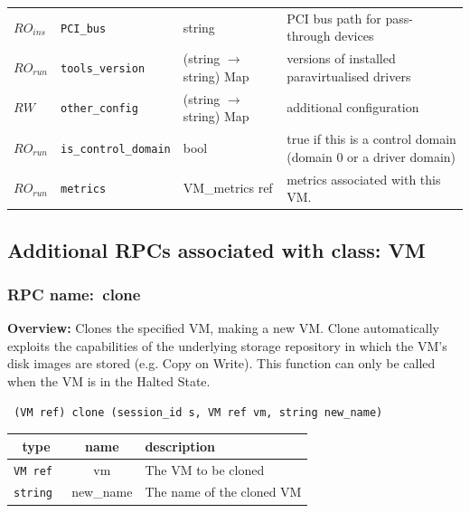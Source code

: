 \begin{longtable}{|lllp{}|}
$\mathit{RO}_\mathit{ins}$ &  {\tt PCI\_bus} & string & PCI bus path for pass-through devices \\
$\mathit{RO}_\mathit{run}$ &  {\tt tools\_version} & (string $\rightarrow$ string) Map & versions of installed paravirtualised drivers \\
$\mathit{RW}$ &  {\tt other\_config} & (string $\rightarrow$ string) Map & additional configuration \\
$\mathit{RO}_\mathit{run}$ &  {\tt is\_control\_domain} & bool & true if this is a control domain (domain 0 or a driver domain) \\
$\mathit{RO}_\mathit{run}$ &  {\tt metrics} & VM\_metrics ref & metrics associated with this VM. \\
\hline
\end{longtable}
\subsection{Additional RPCs associated with class: VM}
\subsubsection{RPC name:~clone}

{\bf Overview:} 
Clones the specified VM, making a new VM. Clone automatically exploits the
capabilities of the underlying storage repository in which the VM's disk
images are stored (e.g. Copy on Write).   This function can only be called
when the VM is in the Halted State.

\begin{verbatim} (VM ref) clone (session_id s, VM ref vm, string new_name)\end{verbatim}



 
\vspace{0.3cm}
\begin{tabular}{|c|c|p{7cm}|}
 \hline
{\bf type} & {\bf name} & {\bf description} \\ \hline
{\tt VM ref } & vm & The VM to be cloned \\ \hline 

{\tt string } & new\_name & The name of the cloned VM \\ \hline 

\end{tabular}

\vspace{0.3cm}

